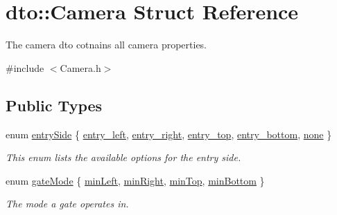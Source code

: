 \hypertarget{structdto_1_1_camera}{}\section{dto\+:\+:Camera Struct Reference}
\label{structdto_1_1_camera}


The camera dto cotnains all camera properties.  




{\ttfamily \#include $<$Camera.\+h$>$}

\subsection*{Public Types}
\begin{DoxyCompactItemize}
\item 
enum \mbox{\hyperlink{structdto_1_1_camera_a6f7db1fcd253e1a84a7e9ac2ffdfa525}{entry\+Side}} \{ \newline
\mbox{\hyperlink{structdto_1_1_camera_a6f7db1fcd253e1a84a7e9ac2ffdfa525a0c937e0b346d8f320649f7e6493c5a7e}{entry\+\_\+left}}, 
\mbox{\hyperlink{structdto_1_1_camera_a6f7db1fcd253e1a84a7e9ac2ffdfa525a2acb2b6dcd6c2dce3969bb6acbffdfd2}{entry\+\_\+right}}, 
\mbox{\hyperlink{structdto_1_1_camera_a6f7db1fcd253e1a84a7e9ac2ffdfa525a77dda736502fd496b968d4ceba0a5e0a}{entry\+\_\+top}}, 
\mbox{\hyperlink{structdto_1_1_camera_a6f7db1fcd253e1a84a7e9ac2ffdfa525ad8616655044cffe307de8b17b95c33c0}{entry\+\_\+bottom}}, 
\newline
\mbox{\hyperlink{structdto_1_1_camera_a6f7db1fcd253e1a84a7e9ac2ffdfa525ad95156a948e1fc27d1d86fa105aea016}{none}}
 \}
\begin{DoxyCompactList}\small\item\em This enum lists the available options for the entry side. \end{DoxyCompactList}\item 
enum \mbox{\hyperlink{structdto_1_1_camera_aba1051d9f599fac2813a0a7bfa50729d}{gate\+Mode}} \{ \mbox{\hyperlink{structdto_1_1_camera_aba1051d9f599fac2813a0a7bfa50729da8038a2e95d5a9de0ac84b9502657c37e}{min\+Left}}, 
\mbox{\hyperlink{structdto_1_1_camera_aba1051d9f599fac2813a0a7bfa50729da64bebefb9f3f361d58da94412e1ec6b5}{min\+Right}}, 
\mbox{\hyperlink{structdto_1_1_camera_aba1051d9f599fac2813a0a7bfa50729daba2ff4ef973d9b55c2a12eae7393c806}{min\+Top}}, 
\mbox{\hyperlink{structdto_1_1_camera_aba1051d9f599fac2813a0a7bfa50729da3a9d6a41d8c013fc6bb7a8d12d1f3351}{min\+Bottom}}
 \}
\begin{DoxyCompactList}\small\item\em The mode a gate operates in. \end{DoxyCompactList}\item 

\end{DoxyCompactItemize}
